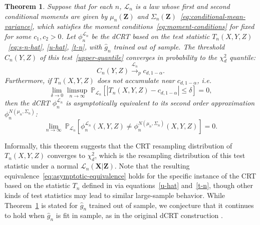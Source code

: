 \documentclass[12pt]{article}
\newtheorem{theorem}{Theorem}
\theoremstyle{definition}
\theoremstyle{remark}
\newcommand{\prx}{\bm X}
\newcommand{\srx}{X}
\newcommand{\prz}{\bm Z}
\newcommand{\srz}{Z}
\newcommand{\sry}{Y}
\begin{document}
\begin{theorem} \label{thm:equivalence}
Suppose that for each $n$, $\mathcal L_n$ is a law whose first and second conditional moments are given by $\mu_n(\prz)$ and $\Sigma_n(\prz)$~\eqref{eq:conditional-mean-variance}, which satisfies the moment conditions~\eqref{eq:moment-conditions} for fixed for some $c_1, c_2 > 0$. Let $\phi_n^{\mathcal L_n}$ be the dCRT based on the test statistic $T_n(\srx, \sry, \srz)$~\eqref{eq:s-n-hat}, \eqref{u-hat}, \eqref{t-n}, with $\widehat g_n$ trained out of sample. The threshold $C_n(\sry, \srz)$ of this test~\eqref{upper-quantile} converges in probability to the $\chi^2_d$ quantile:
	\begin{equation}
		C_n(Y,Z) \overset{\mathcal L_n}\rightarrow_p c_{d,1-\alpha}.
		\label{eq:threshold-convergence}
	\end{equation}
	Furthermore, if $T_n(\srx, \sry, \srz)$ does not accumulate near $c_{d,1-\alpha}$, i.e.
	\begin{equation}
		\lim_{\delta \rightarrow 0}\limsup_{n \rightarrow \infty}\ \mathbb P_{\mathcal L_n}[|T_n(\srx, \sry, \srz)-c_{d,1-\alpha}| \leq \delta] = 0,
		\label{eq:non-accumulation}
	\end{equation}
	then the dCRT $\phi_n^{\mathcal L_n}$ is asymptotically equivalent to its second order approximation $\phi^{N(\mu_n, \Sigma_n)}_n$:
	\begin{equation}
		\lim_{n \rightarrow \infty}\ \mathbb P_{\mathcal L_n}[\phi^{\mathcal L_n}_n(\srx, \sry, \srz) \neq \phi^{N(\mu_n, \Sigma_n)}_n(\srx, \sry, \srz)] = 0.
		\label{eq:asymptotic-equivalence}
	\end{equation}	
\end{theorem}

Informally, this theorem suggests that the CRT resampling distribution of $T_n(\srx, \sry, \srz)$ converges to $\chi^2_d$, which is the resampling distribution of this test statistic under a normal $\mathcal L_n(\prx|\prz)$. Note that the resulting equivalence~\eqref{eq:asymptotic-equivalence} holds for the specific instance of the CRT based on the statistic $T_n$ defined in via equations~\eqref{u-hat} and~\eqref{t-n}, though other kinds of test statistics may lead to similar large-sample behavior. While Theorem~\ref{thm:equivalence} is stated for $\widehat g_n$ trained out of sample, we conjecture that it continues to hold when $\widehat g_n$ is fit in sample, as in the original dCRT construction \cite{Liu2020}. 
\end{document}
